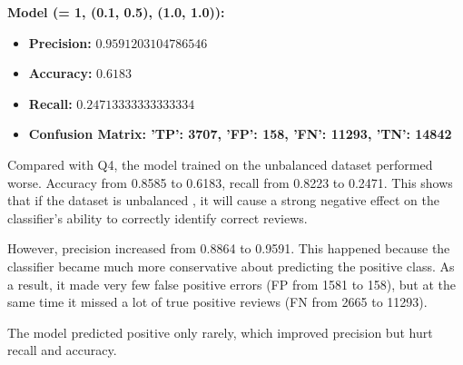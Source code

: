 \documentclass{article}
\begin{document}
\begin{itemize}
\noindent \textbf{Model (\alpha = 1, (0.1, 0.5), (1.0, 1.0)):}

\begin{itemize}
    \item \textbf{Precision: }$0.9591203104786546$
    \item \textbf{Accuracy: }$0.6183$ 
    \item \textbf{Recall: }$0.24713333333333334$
    \item \textbf{Confusion Matrix: 'TP': 3707, 'FP': 158, 'FN': 11293, 'TN': 14842}
\end{itemize}

Compared with Q4, the model trained on the unbalanced dataset performed worse. Accuracy from 0.8585 to 0.6183, recall from 0.8223 to 0.2471. This shows that if the dataset is unbalanced , it will cause a strong negative effect on the classifier's ability to correctly identify correct reviews. 

However, precision increased from 0.8864 to 0.9591. This happened because the classifier became much more conservative about predicting the positive class. As a result, it made very few false positive errors (FP from 1581 to 158), but at the same time it missed a lot of true positive reviews (FN from 2665 to 11293). 

The model predicted positive only rarely, which improved precision but hurt recall and accuracy.  


        


\end{itemize}
\end{document}
